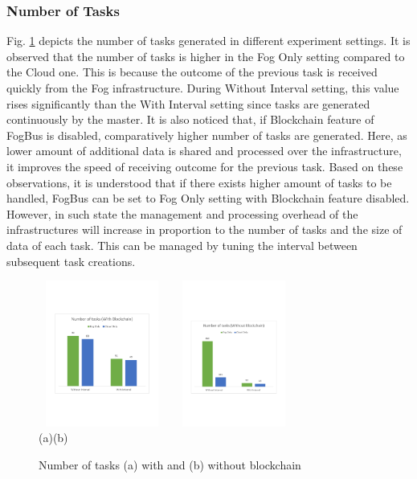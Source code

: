 \documentclass[final,5p,times,twocolumn]{elsarticle}
\begin{document}
\subsubsection{Number of Tasks}
Fig. \ref{fig:task} depicts the number of tasks generated in different experiment settings. It is observed that the number of tasks is higher in the Fog Only setting compared to the Cloud one. This is because the outcome of the previous task is received quickly from the Fog infrastructure. During Without Interval setting, this value rises significantly than the With Interval setting since tasks are generated continuously by the master. It is also noticed that, if Blockchain feature of FogBus is disabled, comparatively higher number of tasks are generated. Here, as lower amount of additional data is shared and processed over the infrastructure, it improves the speed of receiving outcome for the previous task. Based on these observations, it is understood that if there exists higher amount of tasks to be handled, FogBus can be set to Fog Only setting with Blockchain feature disabled. However, in such state the management and processing overhead of the infrastructures will increase in proportion to the number of tasks and the size of data of each task. This can be managed by tuning the interval between subsequent task creations.
%
\begin{figure}[h]
	\begin{center}
	\centering
		\includegraphics[width=42mm, height=48mm]{Tasks1}
		\hspace{5pt}
		\includegraphics[width=42mm, height=48mm]{Tasks2}\\
        \footnotesize{(a)\hspace{120pt}(b)}\\		 
   	\caption{Number of tasks (a) with and (b) without blockchain} \label{fig:task}
	\end{center}
\end{figure}
%
\end{document}
